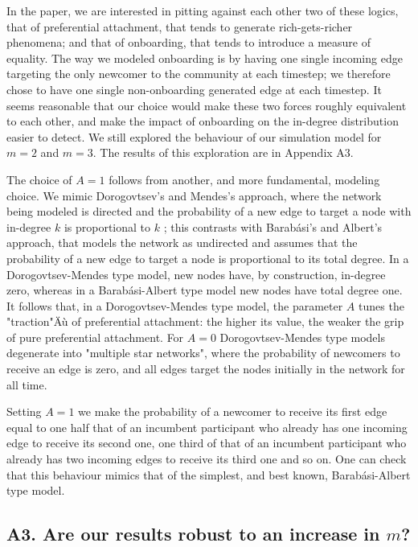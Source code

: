 \documentclass{nws}
\begin{document}
In the paper, we are interested in pitting against each other two of these logics, that of preferential attachment, that tends to generate rich-gets-richer phenomena; and that of onboarding, that tends to introduce a measure of equality. The way we modeled onboarding is by having one single incoming edge targeting the only newcomer to the community at each timestep; we therefore chose to have one single non-onboarding generated edge at each timestep. It seems reasonable that our choice would make  these two forces roughly equivalent to each other, and make the impact of onboarding on the in-degree distribution easier to detect. We still explored the behaviour of our simulation model for $m = 2$ and $m = 3$. The results of this exploration are in Appendix A3.

The choice of $A=1$ follows from another, and more fundamental, modeling choice. We mimic Dorogovtsev's and Mendes's approach, where the network being modeled is directed and the probability of a new edge to target a node with in-degree $k$ is proportional to $k$ \cite{dorogovtsev2002evolution}; this contrasts with Barab\'asi's and Albert's approach, that models the network as undirected and assumes that the probability of a new edge to target a node is proportional to its total degree. In a Dorogovtsev-Mendes type model, new nodes have, by construction, in-degree zero, whereas in a Barab\'asi-Albert type model new nodes have total degree one. It follows that, in a Dorogovtsev-Mendes type model, the parameter $A$ tunes the "traction"Äù of preferential attachment: the higher its value, the weaker the grip of pure preferential attachment. For $A=0$ Dorogovtsev-Mendes type models degenerate into "multiple star networks", where the probability of newcomers to receive an edge is zero, and all edges target the nodes initially in the network for all time. 

Setting $A = 1$ we make the probability of a newcomer to receive its first edge equal to one half that of an incumbent participant who already has one incoming edge to receive its second one, one third of that of an incumbent participant who already has two incoming edges to receive its third one and so on. One can check that this behaviour mimics that of the simplest, and best known, Barab\'asi-Albert type model. 

\subsection{A3. Are our results robust to an increase in $m$?}
\end{document}
